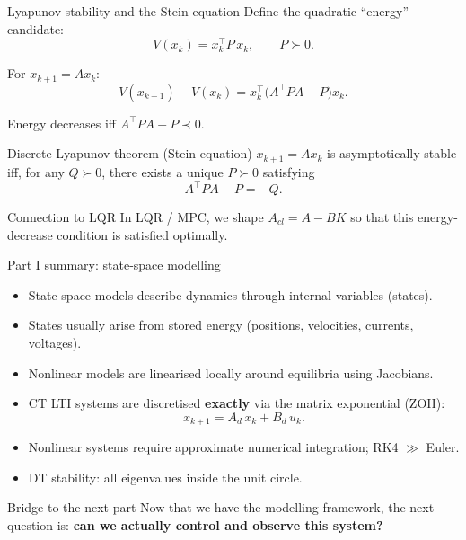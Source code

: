\documentclass[aspectratio=169,10pt]{beamer}
\newcommand{\T}{^\top}
\begin{document}
\begin{frame}{Lyapunov stability and the Stein equation}
Define the quadratic ``energy'' candidate:
\[
V(x_k)=x_k\T P\,x_k,\qquad P\succ 0.
\]

For $x_{k+1}=Ax_k$:
\[
V(x_{k+1})-V(x_k)
= x_k\T\!\big(A\T PA - P\big)x_k.
\]

Energy decreases iff $A\T PA - P \prec 0$.

\begin{alertbox}{Discrete Lyapunov theorem (Stein equation)}
$x_{k+1}=Ax_k$ is asymptotically stable iff, for any $Q\succ 0$, there
exists a unique $P\succ 0$ satisfying
\[
A\T PA - P = -Q.
\]
\end{alertbox}

\begin{notebox}{Connection to LQR}
In LQR / MPC, we shape $A_{cl}=A-BK$ so that this energy-decrease
condition is satisfied optimally.
\end{notebox}
\end{frame}

\begin{frame}{Part I summary: state-space modelling}
\begin{itemize}
  \item State-space models describe dynamics through internal variables (states).
  \item States usually arise from stored energy (positions, velocities, currents, voltages).
  \item Nonlinear models are linearised locally around equilibria using Jacobians.
  \item CT LTI systems are discretised \textbf{exactly} via the matrix exponential (ZOH):
  \[
  x_{k+1}=A_d\,x_k+B_d\,u_k.
  \]
  \item Nonlinear systems require approximate numerical integration; RK4 $\gg$ Euler.
  \item DT stability: all eigenvalues inside the unit circle.
\end{itemize}

\begin{summarybox}{Bridge to the next part}
Now that we have the modelling framework, the next question is:
\textbf{can we actually control and observe this system?}
\end{summarybox}
\end{frame}

\end{document}
